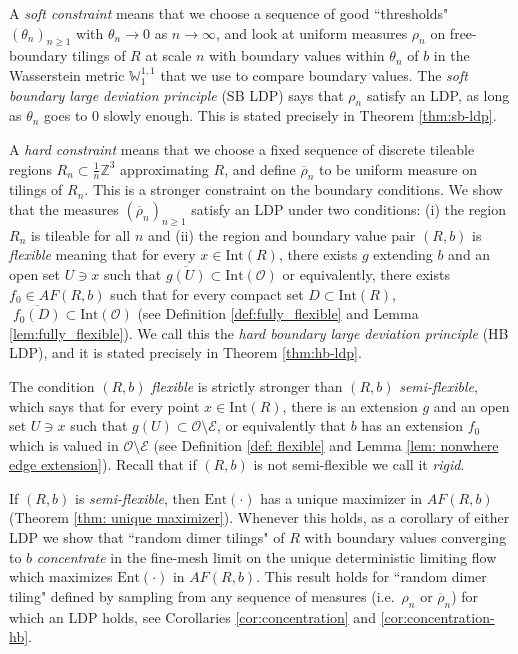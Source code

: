 \documentclass[11pt]{article}
\theoremstyle{remark}
\theoremstyle{definition}
\newcommand{\Ent}{\text{Ent}}
\newcommand{\mc}[1]{\mathcal{#1}}
\newcommand{\m}[1]{\mathbb{#1}}
\begin{document}
A \textit{soft constraint} means that we choose a sequence of good ``thresholds" $(\theta_n)_{n\geq 1}$ with $\theta_n\to 0$ as $n\to \infty$, and look at uniform measures $\rho_n$ on free-boundary tilings of $R$ at scale $n$ with boundary values within $\theta_n$ of $b$ in the Wasserstein metric $\m W_1^{1,1}$ that we use to compare boundary values. The \textit{soft boundary large deviation principle} (SB LDP) says that $\rho_n$ satisfy an LDP, as long as $\theta_n$ goes to $0$ slowly enough. This is stated precisely in Theorem \ref{thm:sb-ldp}. 

A \textit{hard constraint} means that we choose a fixed sequence of discrete tileable regions $R_n\subset \frac{1}{n}\m Z^3$ approximating $R$, and define $\overline \rho_n$ to be uniform measure on tilings of $R_n$. This is a stronger constraint on the boundary conditions.
We show that the measures $(\overline{\rho}_n)_{n\geq 1}$ satisfy an LDP under two conditions: (i) the region $R_n$ is tileable for all $n$ and (ii) the region and boundary value pair $(R,b)$ is \textit{flexible} meaning that for every $x\in \text{Int}(R)$, there exists $g$ extending $b$ and an open set $U\ni x$ such that $\overline{g(U)}\subset \text{Int}(\mc O)$ or equivalently, there exists $f_0\in AF(R,b)$ such that for every compact set $D\subset \text{Int}(R)$, $\;\overline{f_0(D)}\subset \text{Int}(\mc O)$ (see Definition \ref{def:fully_flexible} and Lemma \ref{lem:fully_flexible}). We call this the \textit{hard boundary large deviation principle} (HB LDP), and it is stated precisely in Theorem \ref{thm:hb-ldp}.

The condition $(R,b)$ \textit{flexible} is strictly stronger than $(R,b)$ \textit{semi-flexible}, which says that for every point $x\in \text{Int}(R)$, there is an extension $g$ and an open set $U\ni x$ such that $g(U)\subset \mc O\setminus \mc E$, or equivalently that $b$ has an extension $f_0$ which is valued in $\mc O\setminus \mc E$ (see Definition \ref{def: flexible} and Lemma \ref{lem: nonwhere edge extension}). Recall that if $(R,b)$ is not semi-flexible we call it \textit{rigid}. 

If $(R,b)$ is \textit{semi-flexible}, then $\Ent(\cdot)$ has a unique maximizer in $AF(R,b)$ (Theorem \ref{thm: unique maximizer}). Whenever this holds, as a corollary of either LDP we show that ``random dimer tilings" of $R$ with boundary values converging to $b$ \textit{concentrate} in the fine-mesh limit on the unique deterministic limiting flow which maximizes $\Ent(\cdot)$ in $AF(R,b)$. This result holds for ``random dimer tiling" defined by sampling from any sequence of measures (i.e.\ $\rho_n$ or $\overline{\rho}_n$) for which an LDP holds, see Corollaries \ref{cor:concentration} and \ref{cor:concentration-hb}. 
\end{document}

